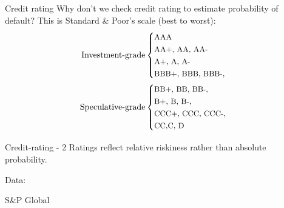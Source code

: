 \documentclass{beamer}
\newcommand{\en}[1]{\begin{otherlanguage}{english}#1\end{otherlanguage}}
\begin{document}
\begin{frame}{Credit rating}
\justify
Why don't we check credit rating to estimate probability of default? This is Standard \& Poor's scale (best to worst):
\begin{align*}
\text{Investment-grade}
\small
&\begin{cases}
\small \text{AAA} \\
\small \text{AA+, AA, AA-} \\
\small \text{A+, A, A-} \\
\small \text{BBB+, BBB, BBB-,}
\end{cases} \\
\text{Speculative-grade}
&\begin{cases}
\small \text{BB+, BB, BB-,} \\
\small \text{B+, B, B-,} \\
\small \text{CCC+, CCC, CCC-,} \\
\small \text{CC,C, D}
\end{cases}
\end{align*}
\end{frame}



\newcommand{\addDefaultRatePlot}[3] {

	\addplot[
		color = #2,
		mark = #3,
		thick
	]
	table[
		x = year,
		y = #1,
		col sep = comma
	]
	{sp_2020_global_corporate_default_rates.csv};
}

\begin{frame}{Credit-rating - 2}
\justify
Ratings reflect relative riskiness rather than absolute probability.

\justify
\centering
{}

\centering
\small Data: \en{S\&P Global}
\end{frame}
\end{document}
